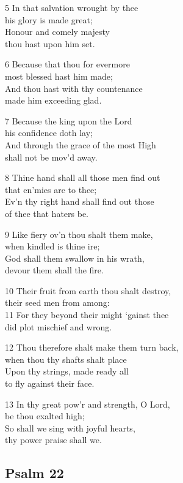 5 In that salvation wrought by thee\\
his glory is made great;\\
Honour and comely majesty\\
thou hast upon him set.

6 Because that thou for evermore\\
most blessed hast him made;\\
And thou hast with thy countenance\\
made him exceeding glad.

7 Because the king upon the Lord\\
his confidence doth lay;\\
And through the grace of the most High\\
shall not be mov’d away.

8 Thine hand shall all those men find out\\
that en’mies are to thee;\\
Ev’n thy right hand shall find out those\\
of thee that haters be.

9 Like fiery ov’n thou shalt them make,\\
when kindled is thine ire;\\
God shall them swallow in his wrath,\\
devour them shall the fire.

10 Their fruit from earth thou shalt destroy,\\
their seed men from among:\\
11 For they beyond their might ‘gainst thee\\
did plot mischief and wrong.

12 Thou therefore shalt make them turn back,\\
when thou thy shafts shalt place\\
Upon thy strings, made ready all\\
to fly against their face.

13 In thy great pow’r and strength, O Lord,\\
be thou exalted high;\\
So shall we sing with joyful hearts,\\
thy power praise shall we.

\begin{center}
\quad{}\quad{}
\end{center}

\subsection*{Psalm 22 }


